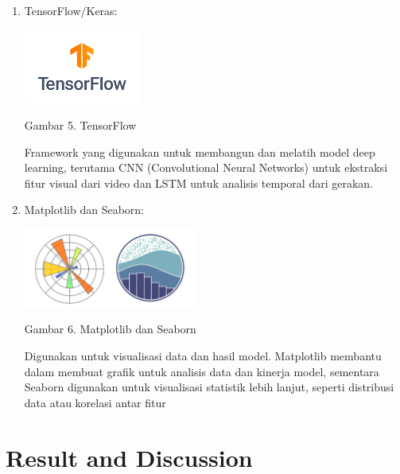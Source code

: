 \documentclass[12pt,a4paper]{article}
\begin{document}
\begin{enumerate}
    \newpage
    \item TensorFlow/Keras: 
    \begin{center}
        \includegraphics[width= 0.3\textwidth]{images/5.png}
    \end{center}
    \begin{center}
        Gambar 5. TensorFlow
    \end{center}
    Framework yang digunakan untuk membangun dan melatih model deep learning, terutama CNN (Convolutional Neural Networks) untuk ekstraksi fitur visual dari video dan LSTM untuk analisis temporal dari gerakan.

    \item Matplotlib dan Seaborn: 
    \begin{center}
        \includegraphics[width=0.45\textwidth]{images/6.png}
    \end{center}
    \begin{center}
        Gambar 6. Matplotlib dan Seaborn
    \end{center}

    Digunakan untuk visualisasi data dan hasil model. Matplotlib membantu dalam membuat grafik untuk analisis data dan kinerja model, sementara Seaborn digunakan untuk visualisasi statistik lebih lanjut, seperti distribusi data atau korelasi antar fitur
\end{enumerate}

\newpage

\section{Result and Discussion}
\end{document}
